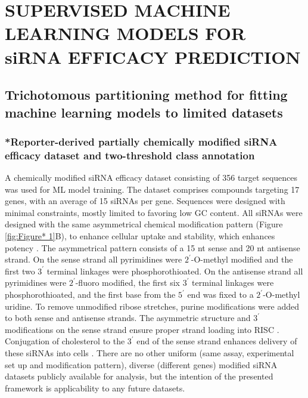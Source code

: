 \documentclass{report}
\begin{document}
\chapter{SUPERVISED MACHINE LEARNING MODELS FOR siRNA EFFICACY PREDICTION}
\section{Trichotomous partitioning method for fitting machine learning models to limited datasets}\label{sec:trichotomous partitioning*}
\subsection{*Reporter-derived partially chemically modified siRNA efficacy dataset and two-threshold class annotation}
A chemically modified siRNA efficacy dataset consisting of 356 target sequences was used for ML model training\cite{shmushkovich_functional_2018}. The dataset comprises compounds targeting 17 genes, with an average of 15 siRNAs per gene. Sequences were designed with minimal constraints, mostly limited to favoring low GC content. All siRNAs were designed with the same asymmetrical chemical modification pattern (Figure \ref{fig:Figure* 1}B), to enhance cellular uptake and stability, which enhances potency \cite{layzer_vivo_2004, czauderna_structural_2003, lorenz_steroid_2004, allerson_fully_2005,choung_chemical_2006, jackson_position-specific_2006}. The asymmetrical pattern consists of a 15 nt sense and 20 nt antisense strand. On the sense strand all pyrimidines were $2^\prime$-O-methyl modified and the first two $3^\prime$ terminal linkages were phosphorothioated. On the antisense strand all pyrimidines were $2^\prime$-fluoro modified, the first six $3^\prime$ terminal linkages were phosphorothioated, and the first base from the $5^\prime$ end was fixed to a $2^\prime$-O-methyl uridine. To remove unmodified ribose stretches, purine modifications were added to both sense and antisense strands. The asymmetric structure and $3^\prime$ modifications on the sense strand ensure proper strand loading into RISC \cite{jackson_position-specific_2006}. Conjugation of cholesterol to the $3^\prime$ end of the sense strand enhances delivery of these siRNAs into cells \cite{ly_visualization_2017}. There are no other uniform (same assay, experimental set up and modification pattern), diverse (different genes) modified siRNA datasets publicly available for analysis, but the intention of the presented framework is applicability to any future datasets.
\end{document}
